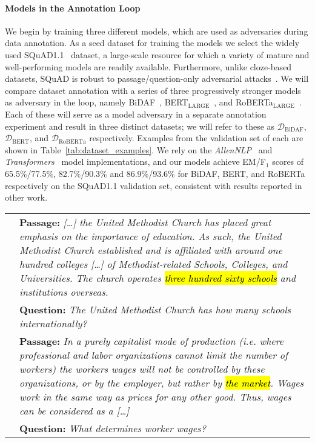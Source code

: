\documentclass[11pt,a4paper]{article}
\DeclareRobustCommand{\hlcustom}[1]{{\sethlcolor{mycol}\hl{#1}}}
\newcommand{\dataset}[1]{\ensuremath{\mathcal{D_{\mathrm{#1}}}}}
\newcommand{\squad}{SQuAD}
\newcommand{\squadone}{SQuAD1.1}
\begin{document}
\paragraph{Models in the Annotation Loop}{
We begin by training three different models, which are used as adversaries during data annotation.
As a seed dataset for training the models we select the widely used \squadone{}~\cite{rajpurkar2016squad} dataset, a large-scale resource for which a variety of mature and well-performing models are readily available.
Furthermore, unlike cloze-based datasets, \squad{} is robust to passage/question-only adversarial attacks~\cite{kaushik-lipton-2018-much}.
We will compare dataset annotation with a series of three progressively stronger models as adversary in the loop, namely BiDAF~\cite{Seo2016BidAF}, BERT$_\text{LARGE}$~\cite{devlin2019bert}, and RoBERTa$_\text{LARGE}$~\cite{liu2019roberta}. 
Each of these will serve as a model adversary in a separate annotation experiment and result in three distinct datasets; we will refer to these as \dataset{BiDAF}, \dataset{BERT}, and \dataset{RoBERTa} respectively. Examples from the validation set of each are shown in Table~\ref{tab:dataset_examples}.
We rely on the \emph{AllenNLP}~\cite{gardner-etal-2018-allennlp} and \emph{Transformers}~\cite{Wolf2019HuggingFacesTS} model implementations, and our models achieve EM/F$_\text{1}$ scores of 65.5\%/77.5\%, 82.7\%/90.3\% and 86.9\%/93.6\% for BiDAF, BERT, and RoBERTa respectively on the \squadone{} validation set, consistent with results reported in other work.


\begin{table*}[!ht]
\centering \footnotesize
\begin{tabular}{p{}p{}}

 \toprule

\parbox[t]{1mm}{} &
\textbf{Passage:} \textit{[\ldots] the United Methodist Church has placed great emphasis on the importance of education. As such, the United Methodist Church established and is affiliated with around one hundred colleges [\dots] of Methodist-related Schools, Colleges, and Universities. The church operates \hlcustom{three hundred sixty schools} and institutions overseas.} \\
& \textbf{Question:} \textit{The United Methodist Church has how many schools internationally?} \\

\midrule

\parbox[t]{1mm}{} &
\textbf{Passage:} \textit{In a purely capitalist mode of production (i.e. where professional and labor organizations cannot limit the number of workers) the workers wages will not be controlled by these organizations, or by the employer, but rather by \hlcustom{the market}. Wages work in the same way as prices for any other good. Thus, wages can be considered as a [\ldots]} \\
& \textbf{Question:} \textit{What determines worker wages?} \\


\end{tabular}
\end{table*}}
\end{document}
